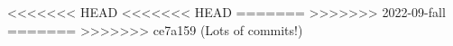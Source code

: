 \documentclass{../../oss-apphys-exam}
\begin{document}
\newpage


<<<<<<< HEAD
<<<<<<< HEAD
=======
>>>>>>> 2022-09-fall
=======
>>>>>>> ce7a159 (Lots of commits!)

  
%
%    
%    
%    
\end{document}
